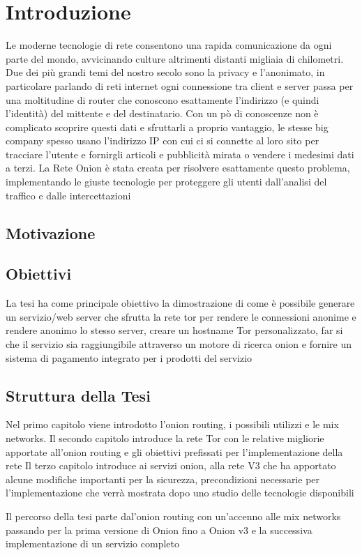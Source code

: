 \chapter{Introduzione}
\label{chap:intro}

Le moderne tecnologie di rete consentono una rapida comunicazione da ogni parte del mondo, avvicinando culture altrimenti distanti migliaia di chilometri. Due dei più grandi temi del nostro secolo sono la privacy e l'anonimato, in particolare parlando di reti internet ogni connessione tra client e server passa per una moltitudine di router che conoscono esattamente l'indirizzo (e quindi l'identità) del mittente e del destinatario. Con un pò di conoscenze non è complicato scoprire questi dati e sfruttarli a proprio vantaggio, le stesse big company spesso usano l'indirizzo IP con cui ci si connette al loro sito per tracciare l'utente e fornirgli articoli e pubblicità mirata o vendere i medesimi dati a terzi. 
La Rete Onion è stata creata per risolvere esattamente questo problema, implementando le giuste tecnologie per proteggere gli utenti dall'analisi del traffico e dalle intercettazioni

\section{Motivazione}
\section{Obiettivi}

La tesi ha come principale obiettivo la dimostrazione di come è possibile generare un servizio/web server che sfrutta la rete tor per rendere le connessioni anonime e rendere anonimo lo stesso server, creare un hostname Tor personalizzato, far si che il servizio sia raggiungibile attraverso un motore di ricerca onion e fornire un sistema di pagamento integrato per i prodotti del servizio

\section{Struttura della Tesi}
Nel primo capitolo viene introdotto l'onion routing, i possibili utilizzi e le mix networks. 
Il secondo capitolo introduce la rete Tor con le relative migliorie apportate all'onion routing e gli obiettivi prefissati per l'implementazione della rete
Il terzo capitolo introduce ai servizi onion, alla rete V3 che ha apportato alcune modifiche importanti per la sicurezza, precondizioni necessarie per l'implementazione che verrà mostrata dopo uno studio delle tecnologie disponibili


Il percorso della tesi parte dal'onion routing con un'accenno alle mix networks passando per la prima versione di Onion fino a Onion v3 e la successiva implementazione di un servizio completo